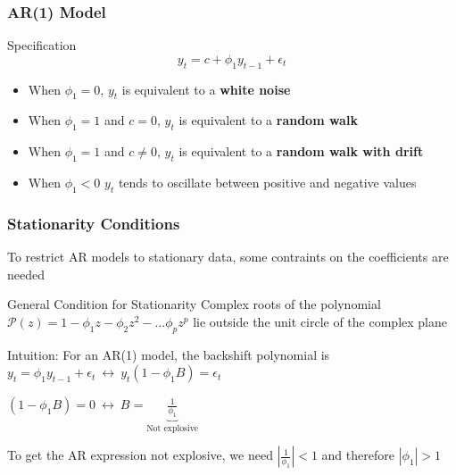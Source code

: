 \documentclass{beamer}
\newenvironment{wideitemize}{\itemize\addtolength{\itemsep}{10pt}}{\enditemize}
\begin{document}
\begin{frame}
  \frametitle{AR(1) Model}
  \begin{block}{Specification}
    \begin{equation*}
      y_t = c + \phi_1 y_{t-1} + \epsilon_t
    \end{equation*}
  \end{block}

  \begin{itemize}
  \item When $\phi_1=0$, $y_t$ is equivalent to a \textbf{white noise}
  \item When $\phi_1=1$ and $c=0$, $y_t$ is equivalent to a \textbf{random walk}
  \item When $\phi_1=1$ and $c \neq 0$, $y_t$ is equivalent to a \textbf{random walk with drift}
  \item When $\phi_1<0$ $y_t$ tends to oscillate between positive and negative values 
  \end{itemize}
  
\end{frame}



\begin{frame}
  \frametitle{Stationarity Conditions}
  To restrict AR models to stationary data, some contraints on the coefficients are needed

  \begin{alertblock}{General Condition for Stationarity}
    Complex roots of the polynomial $\mathcal{P}(z) = 1 - \phi_1z - \phi_2 z^{2} - \dots \phi_p z^{p}$ lie outside the unit circle of the complex plane
  \end{alertblock}

  \begin{wideitemize}
  \item Intuition: For an AR(1) model, the backshift polynomial is $y_t = \phi_1 y_{t-1} + \epsilon_t \ \leftrightarrow \ y_t(1-\phi_1B) = \epsilon_t$
  \item $(1-\phi_1B) = 0 \ \leftrightarrow \ B= \underbrace{\frac{1}{\phi_1}}_{\text{Not explosive}}$
  \item To get the AR expression not explosive, we need $|\frac{1}{\phi_1}| < 1$ and therefore $|\phi_1| > 1$ 
  \end{wideitemize}


  \end{frame}
\end{document}
